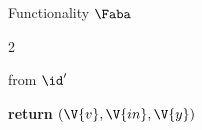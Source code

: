 \begin{interface}[nofloat]{Functionality $\Faba$ \\
}
{\begin{multicols}{2}
\columnbreak

 \quad from $\id'$
\begin{algorithmic}[1]
\algcont
\State \textbf{return} $(\V{v}, \V{in}, \V{y})$ \label{ln:abaleakall}
\algsave
\end{algorithmic}
\end{multicols}}
\end{interface}

